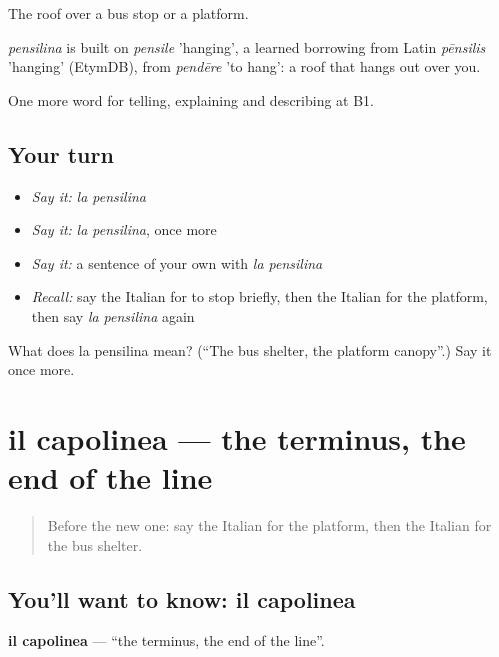 The roof over a bus stop or a platform.

\begin{cousinweb}
\emph{pensilina} is built on \emph{pensile} 'hanging', a learned borrowing from Latin \emph{pēnsilis} 'hanging' (EtymDB), from \emph{pendēre} 'to hang': a roof that hangs out over you.
\end{cousinweb}

\begin{grammarlens}[title={What you've built}]
One more word for telling, explaining and describing at B1.
\end{grammarlens}

\subsection*{Your turn}
\begin{itemize}
\raggedright
  \item \emph{Say it:} \emph{la pensilina}
  \item \emph{Say it:} \emph{la pensilina}, once more
  \item \emph{Say it:} a sentence of your own with \emph{la pensilina}
  \item \emph{Recall:} say the Italian for to stop briefly, then the Italian for the platform, then say \emph{la pensilina} again
\end{itemize}

\begin{tcolorbox}[breakable,colback=teal!4,colframe=teal!35!black,title={Before you move on}]
What does la pensilina mean? (\textquotedblleft{}The bus shelter, the platform canopy\textquotedblright{}.) Say it once more.
\end{tcolorbox}
\section[il capolinea]{il capolinea — the terminus, the end of the line}

\label{lesson:IT-C417-capolinea}



\begin{quote}
Before the new one: say the Italian for the platform, then the Italian for the bus shelter.
\end{quote}

\subsection*{You'll want to know: il capolinea}
\textbf{il capolinea} — \textquotedblleft{}the terminus, the end of the line\textquotedblright{}.

